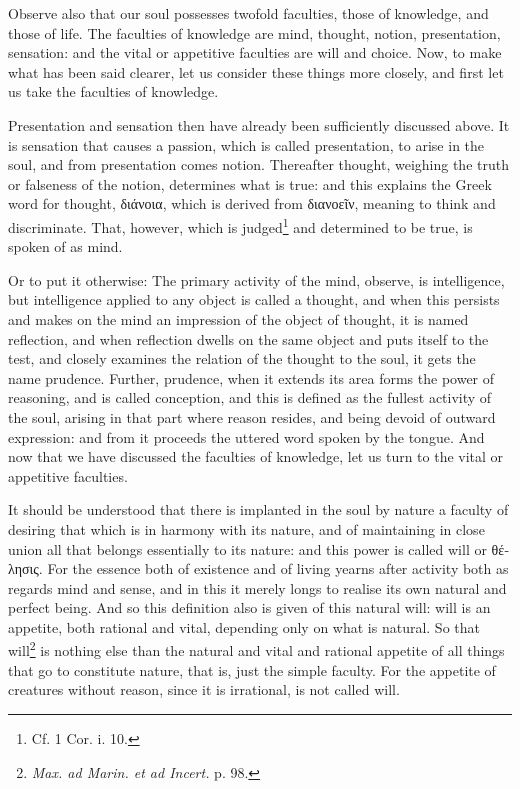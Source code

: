 Observe also that our soul possesses twofold faculties, those of knowledge, and those of life. The faculties of knowledge are mind, thought, notion, presentation, sensation: and the vital or appetitive faculties are will and choice. Now, to make what has been said clearer, let us consider these things more closely, and first let us take the faculties of knowledge.

Presentation and sensation then have already been sufficiently discussed above. It is sensation that causes a passion, which is called presentation, to arise in the soul, and from presentation comes notion. Thereafter thought, weighing the truth or falseness of the notion, determines what is true: and this explains the Greek word for thought, \textgreek{διάνοια}, which is derived from \textgreek{διανοεῖν}, meaning to think and discriminate. That, however, which is judged\footnote{Cf. 1 Cor. i. 10.} and determined to be true, is spoken of as mind.

Or to put it otherwise: The primary activity of the mind, observe, is intelligence, but intelligence applied to any object is called a thought, and when this persists and makes on the mind an impression of the object of thought, it is named reflection, and when reflection dwells on the same object and puts itself to the test, and closely examines the relation of the thought to the soul, it gets the name prudence. Further, prudence, when it extends its area forms the power of reasoning, and is called conception, and this is defined as the fullest activity of the soul, arising in that part where reason resides, and being devoid of outward expression: and from it proceeds the uttered word spoken by the tongue. And now that we have discussed the faculties of knowledge, let us turn to the vital or appetitive faculties.

It should be understood that there is implanted in the soul by nature a faculty of desiring that which is in harmony with its nature, and of maintaining in close union all that belongs essentially to its nature: and this power is called will or \textgreek{θέλησις}. For the essence both of existence and of living yearns after activity both as regards mind and sense, and in this it merely longs to realise its own natural and perfect being. And so this definition also is given of this natural will: will is an appetite, both rational and vital, depending only on what is natural. So that will\footnote{\emph{Max. ad Marin. et ad Incert. }p. 98.} is nothing else than the natural and vital and rational appetite of all things that go to constitute nature, that is, just the simple faculty. For the appetite of creatures without reason, since it is irrational, is not called will.

